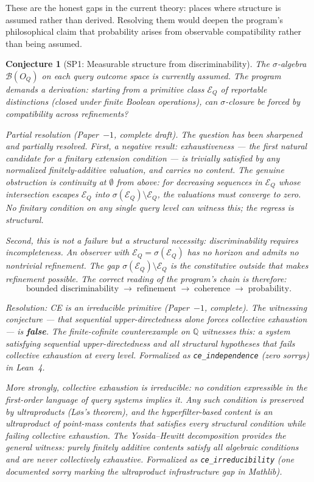 \documentclass[11pt]{article}
\newtheorem{conjecture}{Conjecture}
\begin{document}
These are the honest gaps in the current theory: places where
structure is assumed rather than derived.  Resolving them would
deepen the program's philosophical claim that probability arises
from observable compatibility rather than being assumed.

\begin{conjecture}[SP1: Measurable structure from discriminability]
The $\sigma$-algebra $\mathcal B(O_Q)$ on each query outcome space is
currently assumed.  The program demands a derivation: starting from
a primitive class $\mathcal E_Q$ of reportable distinctions (closed
under finite Boolean operations), can $\sigma$-closure be forced by
compatibility across refinements?

\emph{Partial resolution (Paper~$-1$, complete draft).}
The question has been sharpened and partially resolved.  First, a
negative result: exhaustiveness --- the first natural candidate for a
finitary extension condition --- is trivially satisfied by any
normalized finitely-additive valuation, and carries no content.  The
genuine obstruction is \emph{continuity at $\emptyset$ from above}:
for decreasing sequences in $\mathcal E_Q$ whose intersection escapes
$\mathcal E_Q$ into $\sigma(\mathcal E_Q) \setminus \mathcal E_Q$,
the valuations must converge to zero.  No finitary condition on any
single query level can witness this; the regress is structural.

Second, this is not a failure but a structural necessity:
\emph{discriminability requires incompleteness}.  An observer with
$\mathcal E_Q = \sigma(\mathcal E_Q)$ has no horizon and admits no
nontrivial refinement.  The gap $\sigma(\mathcal E_Q)\setminus\mathcal
E_Q$ is the constitutive outside that makes refinement possible.  The
correct reading of the program's chain is therefore:
\[
\text{bounded discriminability}
\;\to\;
\text{refinement}
\;\to\;
\text{coherence}
\;\to\;
\text{probability.}
\]

\emph{Resolution: CE is an irreducible primitive (Paper~$-1$, complete).}
The witnessing conjecture --- that sequential upper-directedness alone forces collective
exhaustion --- is \textbf{false}.  The finite-cofinite counterexample on $\mathbb{Q}$
witnesses this: a system satisfying sequential upper-directedness and all structural
hypotheses that fails collective exhaustion at every level.  Formalized as
\texttt{ce\_independence} (zero sorrys) in Lean~4.

More strongly, collective exhaustion is \emph{irreducible}: no condition expressible
in the first-order language of query systems implies it.  Any such condition is
preserved by ultraproducts (L\o s's theorem), and the hyperfilter-based content is
an ultraproduct of point-mass contents that satisfies every structural condition while
failing collective exhaustion.  The Yosida--Hewitt decomposition provides the
general witness: purely finitely additive contents satisfy all algebraic conditions
and are never collectively exhaustive.  Formalized as \texttt{ce\_irreducibility}
(one documented sorry marking the ultraproduct infrastructure gap in Mathlib).


\end{conjecture}
\end{document}
